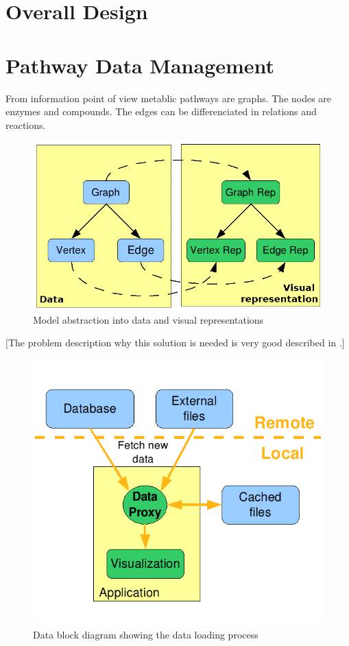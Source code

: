 \section{Overall Design}
\section{Pathway Data Management}

From information point of view metablic pathways are graphs. The nodes are enzymes and compounds. The edges can be differenciated in relations and reactions.

\begin{figure}[ht]
  \centering
    \includegraphics[width=0.5\linewidth]{gfx/model_view_data_diagram}
  \caption{Model abstraction into data and visual representations}
  \label{fig:model_view_data_diagram}
\end{figure}

[The problem description why this solution is needed is very good described in \citep{Bourqui2006}.]

\begin{figure}[ht]
  \centering
    \includegraphics[width=0.5\linewidth]{gfx/data_block_diagram_new}
  \caption{Data block diagram showing the data loading process}
  \label{fig:data_block_diagram}
\end{figure}

